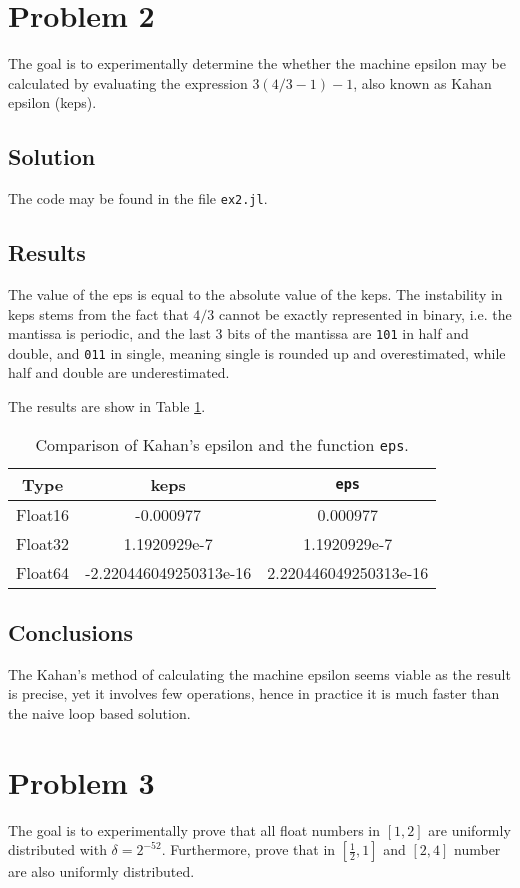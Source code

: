 \documentclass[12pt, a4paper]{article}
\newcommand{\code}[1]{\texttt{#1}}
\begin{document}
\section{Problem 2}
The goal is to experimentally determine the whether the machine epsilon may be
calculated by evaluating the expression $3(4 / 3 - 1) - 1$, also known as Kahan
epsilon (keps).

\subsection{Solution}
The code may be found in the file \code{ex2.jl}.

\subsection{Results}
The value of the eps is equal to the absolute value of the keps. The instability
in keps stems from the fact that $4 / 3$ cannot be exactly represented in
binary, i.e. the mantissa is periodic, and the last 3 bits of the mantissa are
\code{101} in half and double, and \code{011} in single, meaning single is
rounded up and overestimated, while half and double are underestimated.

The results are show in Table \ref{tab:kahan}.

\begin{table}[h]
\centering
\begin{tabular}{@{}ccc@{}}
\toprule
Type    & keps                  & \code{eps}            \\ \midrule
Float16 & -0.000977              & 0.000977              \\ \midrule
Float32 & 1.1920929e-7           & 1.1920929e-7          \\ \midrule
Float64 & -2.220446049250313e-16 & 2.220446049250313e-16 \\ \bottomrule
\end{tabular}
\caption{Comparison of Kahan's epsilon and the function \code{eps}.}
\label{tab:kahan}
\end{table}

\subsection{Conclusions}
The Kahan's method of calculating the machine epsilon seems viable as the result
is precise, yet it involves few operations, hence in practice it is much faster
than the naive loop based solution.

\section{Problem 3}
The goal is to experimentally prove that all float numbers in $[1, 2]$ are
uniformly distributed with $\delta = 2^{-52}$. Furthermore, prove that in
$[\frac{1}{2}, 1]$ and $[2, 4]$ number are also uniformly distributed.
\end{document}
